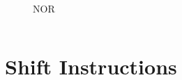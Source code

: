 \documentclass[
	10pt, %
	hmargin=1cm,vmargin=0cm,head=0.5cm,headsep=0pt,foot=0.5cm,margin=2cm
]{beamer}
\begin{document}
\begin{frame}
\begin{columns}[c]
\begin{column}{0.45\textwidth}
\begin{columns}[c]
\begin{column}{0.3\textwidth}
\begin{figure}
						\caption{NOR}
					\end{figure}
				\end{column}
				\begin{column}{0.7\textwidth} 
					\begin{table}
					\end{table}
				\end{column}
			\end{columns}
		\end{column}
	\end{columns}
\end{frame}

\section{Shift Instructions} 
\end{document}
